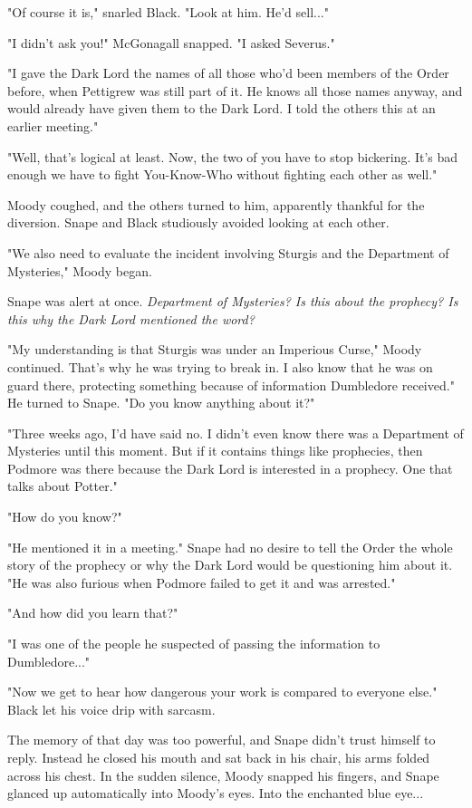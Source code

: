 \documentclass[a4paper,11pt]{article}
\begin{document}
"Of course it is," snarled Black. "Look at him. He'd sell..."

"I didn't ask you!" McGonagall snapped. "I asked Severus."

"I gave the Dark Lord the names of all those who'd been members of the Order before, when Pettigrew was still part of it. He knows all those names anyway, and would already have given them to the Dark Lord. I told the others this at an earlier meeting."

"Well, that's logical at least. Now, the two of you have to stop bickering. It's bad enough we have to fight You-Know-Who without fighting each other as well."

Moody coughed, and the others turned to him, apparently thankful for the diversion. Snape and Black studiously avoided looking at each other.

"We also need to evaluate the incident involving Sturgis and the Department of Mysteries," Moody began.

Snape was alert at once. \emph{Department of Mysteries? Is this about the prophecy? Is this why the Dark Lord mentioned the word?}

"My understanding is that Sturgis was under an Imperious Curse," Moody continued. That's why he was trying to break in. I also know that he was on guard there, protecting something because of information Dumbledore received." He turned to Snape. "Do you know anything about it?"

"Three weeks ago, I'd have said no. I didn't even know there was a Department of Mysteries until this moment. But if it contains things like prophecies, then Podmore was there because the Dark Lord is interested in a prophecy. One that talks about Potter."

"How do you know?"

"He mentioned it in a meeting." Snape had no desire to tell the Order the whole story of the prophecy or why the Dark Lord would be questioning him about it. "He was also furious when Podmore failed to get it and was arrested."

"And how did you learn that?"

"I was one of the people he suspected of passing the information to Dumbledore..."

"Now we get to hear how dangerous your work is compared to everyone else." Black let his voice drip with sarcasm.

The memory of that day was too powerful, and Snape didn't trust himself to reply. Instead he closed his mouth and sat back in his chair, his arms folded across his chest. In the sudden silence, Moody snapped his fingers, and Snape glanced up automatically into Moody's eyes. Into the enchanted blue eye...
\end{document}
